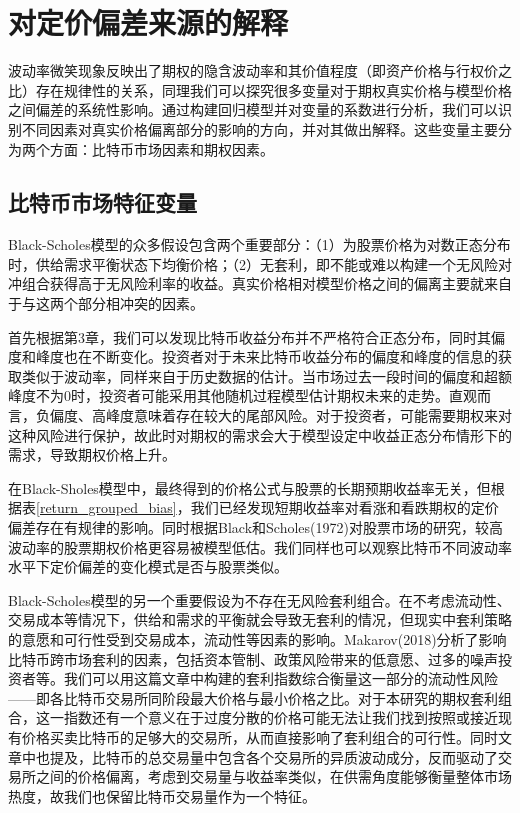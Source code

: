\section{对定价偏差来源的解释}\label{reg vars}
波动率微笑现象反映出了期权的隐含波动率和其价值程度（即资产价格与行权价之比）存在规律性的关系，同理我们可以探究很多变量对于期权真实价格与模型价格之间偏差的系统性影响。通过构建回归模型并对变量的系数进行分析，我们可以识别不同因素对真实价格偏离部分的影响的方向，并对其做出解释。这些变量主要分为两个方面：比特币市场因素和期权因素。
\subsection{比特币市场特征变量}
\par{Black-Scholes模型的众多假设包含两个重要部分：（1）为股票价格为对数正态分布时，供给需求平衡状态下均衡价格；（2）无套利，即不能或难以构建一个无风险对冲组合获得高于无风险利率的收益。真实价格相对模型价格之间的偏离主要就来自于与这两个部分相冲突的因素。}
\par{首先根据第3章，我们可以发现比特币收益分布并不严格符合正态分布，同时其偏度和峰度也在不断变化。投资者对于未来比特币收益分布的偏度和峰度的信息的获取类似于波动率，同样来自于历史数据的估计。当市场过去一段时间的偏度和超额峰度不为0时，投资者可能采用其他随机过程模型估计期权未来的走势。直观而言，负偏度、高峰度意味着存在较大的尾部风险。对于投资者，可能需要期权来对这种风险进行保护，故此时对期权的需求会大于模型设定中收益正态分布情形下的需求，导致期权价格上升。}
\par{在Black-Sholes模型中，最终得到的价格公式与股票的长期预期收益率无关，但根据表\ref{return_grouped_bias}，我们已经发现短期收益率对看涨和看跌期权的定价偏差存在有规律的影响。同时根据Black和Scholes(1972)对股票市场的研究，较高波动率的股票期权价格更容易被模型低估。我们同样也可以观察比特币不同波动率水平下定价偏差的变化模式是否与股票类似。}
\par{
    Black-Scholes模型的另一个重要假设为不存在无风险套利组合。在不考虑流动性、交易成本等情况下，供给和需求的平衡就会导致无套利的情况，但现实中套利策略的意愿和可行性受到交易成本，流动性等因素的影响。Makarov(2018)分析了影响比特币跨市场套利的因素，包括资本管制、政策风险带来的低意愿、过多的噪声投资者等\cite{Makarov-2018}。我们可以用这篇文章中构建的套利指数综合衡量这一部分的流动性风险——即各比特币交易所同阶段最大价格与最小价格之比。对于本研究的期权套利组合，这一指数还有一个意义在于过度分散的价格可能无法让我们找到按照或接近现有价格买卖比特币的足够大的交易所，从而直接影响了套利组合的可行性。同时文章中也提及，比特币的总交易量中包含各个交易所的异质波动成分，反而驱动了交易所之间的价格偏离，考虑到交易量与收益率类似，在供需角度能够衡量整体市场热度，故我们也保留比特币交易量作为一个特征。

}
